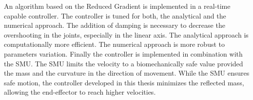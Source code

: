 An algorithm based on the Reduced  Gradient is implemented in a real-time capable controller. The controller is tuned for both, the analytical and the numerical approach. The addition of damping is necessary to decrease the overshooting in the joints, especially in the linear axis. The analytical approach is  computationally more efficient. The numerical approach is more robust to parameters variation.
Finally the controller is implemented in combination with the SMU. The SMU limits the velocity to a biomechanically safe value provided the mass and the curvature in the direction of movement. While the SMU ensures safe motion, the controller developed in this thesis minimizes the reflected mass, allowing the end-effector to reach higher velocities. 

%
%
%
%
%
%
%
%
%
%
%
%
